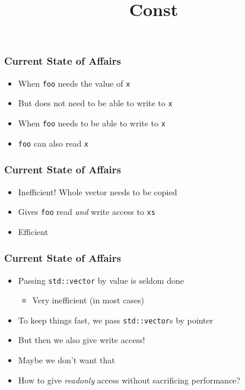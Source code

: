 
\usetikzlibrary{shadows,shapes.multipart}

\title{Const}






\begin{frame}
  \titlepage
\end{frame}

\begin{frame}
  \frametitle{Current State of Affairs}
  \begin{itemize}
    \item When \texttt{foo} needs the value of \texttt{x}
    \item But does not need to be able to write to \texttt{x}
  \end{itemize}
  \vskip2mm
  \begin{itemize}
    \item When \texttt{foo} needs to be able to write to \texttt{x}
    \item \texttt{foo} can also read \texttt{x}
  \end{itemize}
\end{frame}

\begin{frame}
  \frametitle{Current State of Affairs}
  \begin{itemize}
    \item Inefficient! Whole vector needs to be copied
  \end{itemize}
  \vskip2mm
  \begin{itemize}
    \item Gives \texttt{foo} read \emph{and} write access to \texttt{xs}
    \item Efficient
  \end{itemize}
\end{frame}

\begin{frame}
  \frametitle{Current State of Affairs}
  \begin{itemize}
    \item Passing \texttt{std::vector} by value is seldom done
          \begin{itemize}
            \item Very inefficient (in most cases)
          \end{itemize}
    \item To keep things fast, we pass \texttt{std::vector}s by pointer
    \item But then we also give write access!
    \item Maybe we don't want that
    \item How to give \emph{readonly} access without sacrificing performance?
  \end{itemize}
\end{frame}

